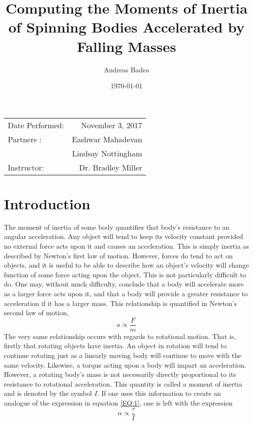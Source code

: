 \documentclass[11pt]{article}
\title{Computing the Moments of Inertia of Spinning Bodies Accelerated by Falling Masses}
\author{Andreas Badea}
\date{\today}
\begin{document}
\maketitle

\begin{center}
	\begin{tabular}{l r}
		Date Performed: & November 3, 2017 \\ %
		Partners : & Eashwar Mahadevan \\
		& Lindsay Nottingham \\
		Instructor: & Dr. Bradley Miller %
	\end{tabular}
\end{center}

\section{Introduction}
The moment of inertia of some body quantifies that body's resistance to an angular acceleration. Any object will tend to keep its velocity constant provided no external force acts upon it and causes an acceleration. This is simply inertia as described by Newton's first law of motion. However, forces do tend to act on objects, and it is useful to be able to describe how an object's velocity will change function of some force acting upon the object. This is not particularly difficult to do. One may, without much difficulty, conclude that a body will accelerate more as a larger force acts upon it, and that a body will provide a greater resistance to acceleration if it has a larger mass. This relationship is quantified in Newton's second law of motion, 
\begin{equation}
a \propto \frac{F}{m} \label{EQ:1}
\end{equation}
The very same relationship occurs with regards to rotational motion. That is, firstly that rotating objects have inertia. An object in rotation will tend to continue rotating just as a linearly moving body will continue to move with the same velocity. Likewise, a torque acting upon a body will impart an acceleration. However, a rotating body's mass is not necessarily directly proportional to its resistance to rotational acceleration. This quantity is called a moment of inertia and is denoted by the symbol \(I\). If one uses this information to create an analogue of the expression in equation \eqref{EQ:1}, one is left with the expression 
\begin{equation}
\alpha \propto \frac{\tau}{I}
\end{equation}
\end{document}
